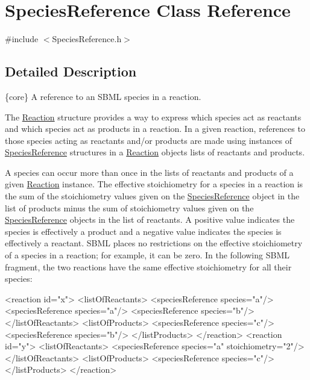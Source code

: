 \hypertarget{class_species_reference}{}\section{Species\+Reference Class Reference}
\label{class_species_reference}


{\ttfamily \#include $<$Species\+Reference.\+h$>$}



\subsection{Detailed Description}
\{core\} A reference to an S\+B\+ML species in a reaction.

The \hyperlink{class_reaction}{Reaction} structure provides a way to express which species act as reactants and which species act as products in a reaction. In a given reaction, references to those species acting as reactants and/or products are made using instances of \hyperlink{class_species_reference}{Species\+Reference} structures in a \hyperlink{class_reaction}{Reaction} object\textquotesingle{}s lists of reactants and products.

A species can occur more than once in the lists of reactants and products of a given \hyperlink{class_reaction}{Reaction} instance. The effective stoichiometry for a species in a reaction is the sum of the stoichiometry values given on the \hyperlink{class_species_reference}{Species\+Reference} object in the list of products minus the sum of stoichiometry values given on the \hyperlink{class_species_reference}{Species\+Reference} objects in the list of reactants. A positive value indicates the species is effectively a product and a negative value indicates the species is effectively a reactant. S\+B\+ML places no restrictions on the effective stoichiometry of a species in a reaction; for example, it can be zero. In the following S\+B\+ML fragment, the two reactions have the same effective stoichiometry for all their species\+: \begin{DoxyVerb}<reaction id="x">
    <listOfReactants>
        <speciesReference species="a"/>
        <speciesReference species="a"/>
        <speciesReference species="b"/>
    </listOfReactants>
    <listOfProducts>
        <speciesReference species="c"/>
        <speciesReference species="b"/>
    </listProducts>
</reaction>
<reaction id="y">
    <listOfReactants>
        <speciesReference species="a" stoichiometry="2"/>
    </listOfReactants>
    <listOfProducts>
        <speciesReference species="c"/>
    </listProducts>
</reaction>
\end{DoxyVerb}


